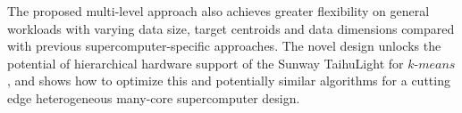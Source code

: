 \documentclass[10pt,journal,compsoc]{IEEEtran}
\begin{document}
{The proposed multi-level approach also achieves greater flexibility on general workloads with varying data size, target centroids and data dimensions compared with previous supercomputer-specific approaches.  The novel design unlocks the potential of hierarchical hardware support of the Sunway TaihuLight for $k$-$means$, and shows how to optimize this and potentially similar algorithms for a cutting edge heterogeneous many-core supercomputer design.















}
\end{document}

